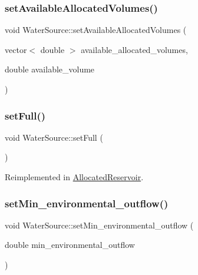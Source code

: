 \subsubsection{\texorpdfstring{set\+Available\+Allocated\+Volumes()}{setAvailableAllocatedVolumes()}}
{\footnotesize\ttfamily void Water\+Source\+::set\+Available\+Allocated\+Volumes (\begin{DoxyParamCaption}\item[{vector$<$ double $>$}]{available\+\_\+allocated\+\_\+volumes,  }\item[{double}]{available\+\_\+volume }\end{DoxyParamCaption})}

\mbox{\label{classWaterSource_a5f8007eb1ae604cfaa67ebb4c0c46eb1_a5f8007eb1ae604cfaa67ebb4c0c46eb1}} 
\subsubsection{\texorpdfstring{set\+Full()}{setFull()}}
{\footnotesize\ttfamily void Water\+Source\+::set\+Full (\begin{DoxyParamCaption}{ }\end{DoxyParamCaption})\hspace{0.3cm}{\ttfamily [virtual]}}



Reimplemented in \mbox{\hyperlink{classAllocatedReservoir_aea294cbca1e1630a1307072632d14b05_aea294cbca1e1630a1307072632d14b05}{Allocated\+Reservoir}}.

\mbox{\label{classWaterSource_a406246432d29f49189d53207ab1d895a_a406246432d29f49189d53207ab1d895a}} 
\subsubsection{\texorpdfstring{set\+Min\+\_\+environmental\+\_\+outflow()}{setMin\_environmental\_outflow()}}
{\footnotesize\ttfamily void Water\+Source\+::set\+Min\+\_\+environmental\+\_\+outflow (\begin{DoxyParamCaption}\item[{double}]{min\+\_\+environmental\+\_\+outflow }\end{DoxyParamCaption})}

